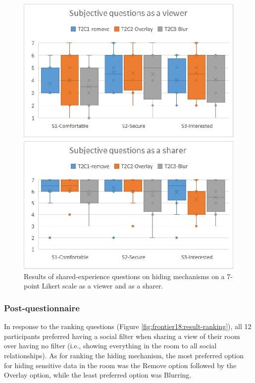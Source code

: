 \begin{figure}
    \begin{center}
    \includegraphics[width=.8\linewidth]{images/54-hiding-frontier18/images-15.eps}
    \caption{Results of shared-experience questions on hiding mechanisms on a 7-point Likert scale as a viewer and as a sharer.}
    \label{fig:frontier18:result-shared-experience-questions-hiding}
    \end{center}
\end{figure}

\subsubsection{Post-questionnaire}

In response to the ranking questions (Figure \ref{fig:frontier18:result-ranking}), all 12 participants preferred having a social filter when sharing a view of their room over having no filter (i.e., showing everything in the room to all social relationships). As for ranking the hiding mechanism, the most preferred option for hiding sensitive data in the room was the Remove option followed by the Overlay option, while the least preferred option was Blurring. 

